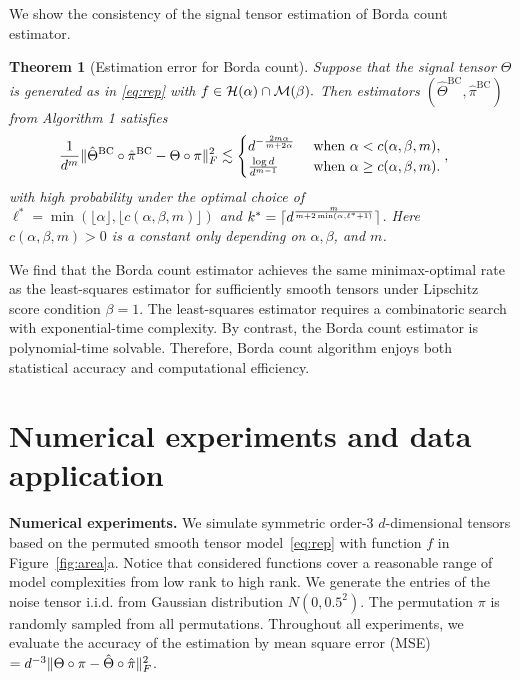 \documentclass{article}
\newtheorem{thm}{Theorem}
\theoremstyle{definition}
\begin{document}
We show the consistency of the signal tensor estimation of Borda count estimator.
\begin{thm}[Estimation error for Borda count]\label{thm:BC}
Suppose that the signal tensor $\Theta$ is generated as in  \eqref{eq:rep} with $f\in\mathcal{H}(\alpha)\cap \mathcal{M}(\beta).$
Then estimators $(\hat\Theta^{\text{BC}},\hat\pi^{\text{BC}})$ from Algorithm 1 satisfies
\begin{align}\label{eq:BC}
   \frac{1}{d^m}&\lVert\hat\Theta^{\textup{BC}}\circ\hat\pi^{\textup{BC}}-\Theta\circ \pi\rVert_F^2\lesssim  \begin{cases}d^{-{2m\alpha\over m+2\alpha}} & \text{ when } \alpha <c(\alpha,\beta,m),\\{\log d\over d^{m-1}}&\text{ when } \alpha \geq c(\alpha,\beta,m).\end{cases},
\end{align}
with high probability under the optimal choice of $\ell^* = \min(\lfloor\alpha\rfloor,\lfloor c(\alpha,\beta,m)\rfloor)$ and $k^* = \lceil d^{m\over m+2\min(\alpha,\ell^*+1)}\rceil$.  Here $c(\alpha,\beta,m)>0$ is a constant only depending on $\alpha,\beta$,  and $m$.
\end{thm}
We find that the Borda count estimator achieves the same minimax-optimal rate as the least-squares estimator for sufficiently smooth tensors under Lipschitz score condition $\beta =1$. The least-squares estimator requires a combinatoric search with exponential-time complexity. By contrast, the Borda count estimator is polynomial-time solvable. Therefore, Borda count algorithm enjoys both statistical accuracy and computational efficiency. 


\vspace{-.3cm}
\section{Numerical experiments and data application}\label{sec:sim}
\vspace{-.3cm}
{\bf Numerical experiments.} We simulate symmetric order-3 $d$-dimensional tensors based on the permuted smooth tensor model~\eqref{eq:rep} with function $f$ in Figure~\ref{fig:area}a. Notice that considered functions cover a reasonable range of model complexities from low rank to high rank. We generate the entries of the noise tensor i.i.d. from Gaussian distribution $N(0,0.5^2)$. The permutation $\pi$ is randomly sampled from all permutations. 
Throughout all experiments, we evaluate the accuracy of the estimation by mean square error (MSE) $= d^{-3}\lVert\Theta\circ\pi-\hat\Theta\circ\hat\pi\rVert_F^2$.
\end{document}
